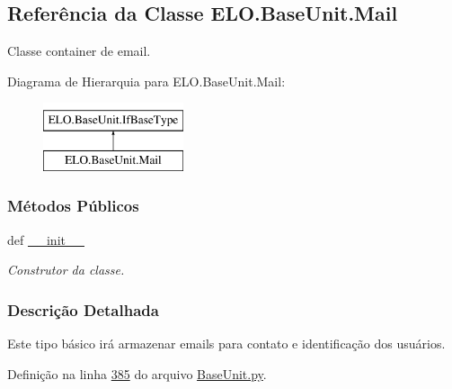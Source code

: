 \hypertarget{classELO_1_1BaseUnit_1_1Mail}{\subsection{Referência da Classe E\-L\-O.\-Base\-Unit.\-Mail}
\label{classELO_1_1BaseUnit_1_1Mail}
}


Classe container de email.  


Diagrama de Hierarquia para E\-L\-O.\-Base\-Unit.\-Mail\-:\begin{figure}[H]
\begin{center}
\leavevmode
\includegraphics[height=2.000000cm]{d5/db6/classELO_1_1BaseUnit_1_1Mail}
\end{center}
\end{figure}
\subsubsection*{Métodos Públicos}
\begin{DoxyCompactItemize}
\item 
def \hyperlink{classELO_1_1BaseUnit_1_1Mail_a7b9e31959dacc8c25ecae3e9bc0321aa}{\-\_\-\-\_\-init\-\_\-\-\_\-}
\begin{DoxyCompactList}\small\item\em Construtor da classe. \end{DoxyCompactList}\end{DoxyCompactItemize}


\subsubsection{Descrição Detalhada}
Este tipo básico irá armazenar emails para contato e identificação dos usuários. 

Definição na linha \hyperlink{BaseUnit_8py_source_l00385}{385} do arquivo \hyperlink{BaseUnit_8py_source}{Base\-Unit.\-py}.




